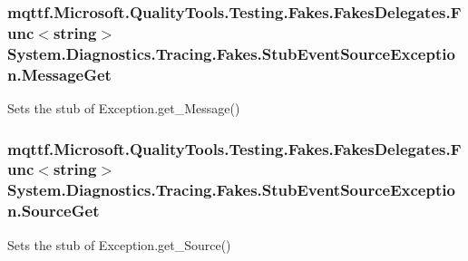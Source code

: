 \hypertarget{class_system_1_1_diagnostics_1_1_tracing_1_1_fakes_1_1_stub_event_source_exception_a74888ea0c0160ae5ff94e9fc5600bd76}{
\subsubsection[{Message\-Get}]{\setlength{\rightskip}{0pt plus 5cm}mqttf.\-Microsoft.\-Quality\-Tools.\-Testing.\-Fakes.\-Fakes\-Delegates.\-Func$<$string$>$ System.\-Diagnostics.\-Tracing.\-Fakes.\-Stub\-Event\-Source\-Exception.\-Message\-Get}}\label{class_system_1_1_diagnostics_1_1_tracing_1_1_fakes_1_1_stub_event_source_exception_a74888ea0c0160ae5ff94e9fc5600bd76}


Sets the stub of Exception.\-get\-\_\-\-Message()

\hypertarget{class_system_1_1_diagnostics_1_1_tracing_1_1_fakes_1_1_stub_event_source_exception_a2e030cb3254081e2e0f78dffe54b24d0}{
\subsubsection[{Source\-Get}]{\setlength{\rightskip}{0pt plus 5cm}mqttf.\-Microsoft.\-Quality\-Tools.\-Testing.\-Fakes.\-Fakes\-Delegates.\-Func$<$string$>$ System.\-Diagnostics.\-Tracing.\-Fakes.\-Stub\-Event\-Source\-Exception.\-Source\-Get}}\label{class_system_1_1_diagnostics_1_1_tracing_1_1_fakes_1_1_stub_event_source_exception_a2e030cb3254081e2e0f78dffe54b24d0}


Sets the stub of Exception.\-get\-\_\-\-Source()

